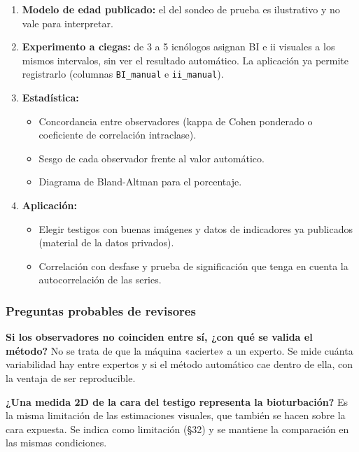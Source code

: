 \documentclass[
  10pt,
]{article}
\providecommand{\tightlist}{%
  \setlength{\itemsep}{0pt}\setlength{\parskip}{0pt}}
\begin{document}
\begin{enumerate}
\def\labelenumi{\arabic{enumi}.}
\setcounter{enumi}{-1}
\tightlist
\item
  \textbf{Modelo de edad publicado:} el del sondeo de prueba es
  ilustrativo y no vale para interpretar.
\item
  \textbf{Experimento a ciegas:} de 3 a 5 icnólogos asignan BI e ii
  visuales a los mismos intervalos, sin ver el resultado automático. La
  aplicación ya permite registrarlo (columnas \texttt{BI\_manual} e
  \texttt{ii\_manual}).
\item
  \textbf{Estadística:}

  \begin{itemize}
  \tightlist
  \item
    Concordancia entre observadores (kappa de Cohen ponderado o
    coeficiente de correlación intraclase).
  \item
    Sesgo de cada observador frente al valor automático.
  \item
    Diagrama de Bland-Altman para el porcentaje.
  \end{itemize}
\item
  \textbf{Aplicación:}

  \begin{itemize}
  \tightlist
  \item
    Elegir testigos con buenas imágenes y datos de indicadores ya
    publicados (material de la datos privados).
  \item
    Correlación con desfase y prueba de significación que tenga en
    cuenta la autocorrelación de las series.
  \end{itemize}
\end{enumerate}

\hypertarget{preguntas-probables-de-revisores-1}{%
\subsubsection{Preguntas probables de
revisores}\label{preguntas-probables-de-revisores-1}}

\textbf{Si los observadores no coinciden entre sí, ¿con qué se valida el
método?} No se trata de que la máquina «acierte» a un experto. Se mide
cuánta variabilidad hay entre expertos y si el método automático cae
dentro de ella, con la ventaja de ser reproducible.

\textbf{¿Una medida 2D de la cara del testigo representa la
bioturbación?} Es la misma limitación de las estimaciones visuales, que
también se hacen sobre la cara expuesta. Se indica como limitación (§32)
y se mantiene la comparación en las mismas condiciones.
\end{document}
